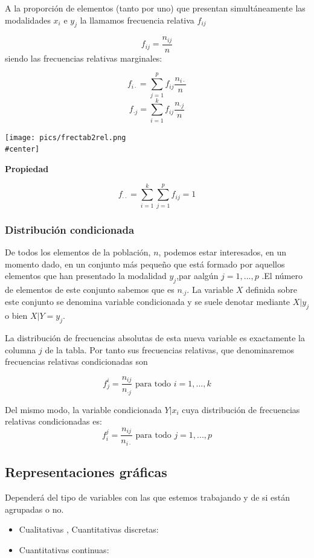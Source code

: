 \documentclass[]{article}
\def\tightlist{}
\numberwithin{equation}{section}
\begin{document}
A la proporción de elementos (tanto por uno) que presentan
simultáneamente las modalidades \(x_i\) e \(y_j\) la llamamos frecuencia
relativa \(f_{ij}\)

\[
    f_{ij} = \frac{n_{ij}}{n}
\] siendo las frecuencias relativas marginales:

\[
      f_{i\cdot} = \sum_{j=1}^{p}f_{ij}\frac{n_{i\cdot}}{n}
\] \[
      f_{\cdot j} = \sum_{i=1}^{k}f_{ij}\frac{n_{\cdot j}}{n}
\]

\texttt{[image: pics/frectab2rel.png\\\#center]}

\textbf{Propiedad}

\[
    f_{\cdot\cdot} = \sum_{i=1}^{k}\sum_{j=1}^{p} f_{ij} = 1
\]

\subsubsection{Distribución
condicionada}\label{distribucion-condicionada}

De todos los elementos de la población, \(n\), podemos estar
interesados, en un momento dado, en un conjunto más pequeño que está
formado por aquellos elementos que han presentado la modalidad
\(y_j\),par aalgún \(j=1,...,p\) .El número de elementos de este
conjunto sabemos que es \(n_{\cdot j}\). La variable \(X\) definida
sobre este conjunto se denomina variable condicionada y se suele denotar
mediante \(X|y_j\) o bien \(X|Y=y_j\).

La distribución de frecuencias absolutas de esta nueva variable es
exactamente la columna \(j\) de la tabla. Por tanto sus frecuencias
relativas, que denominaremos frecuencias relativas condicionadas son

\[
    f_j^{i} = \frac{n_{ij}}{n_{\cdot j}} \mbox{ para todo $i= 1,...,k$}
\]

Del mismo modo, la variable condicionada \(Y|x_i\) cuya distribución de
frecuencias relativas condicionadas es: \[
    f_i^{j} = \frac{n_{ij}}{n_{i\cdot}} \mbox{ para todo $j= 1,...,p$}
\]

\subsection{Representaciones gráficas}\label{representaciones-graficas}

Dependerá del tipo de variables con las que estemos trabajando y de si
están agrupadas o no.

\begin{itemize}
\tightlist
\item
  Cualitativas , Cuantitativas discretas:
\item
  Cuantitativas continuas:
\end{itemize}
\end{document}
